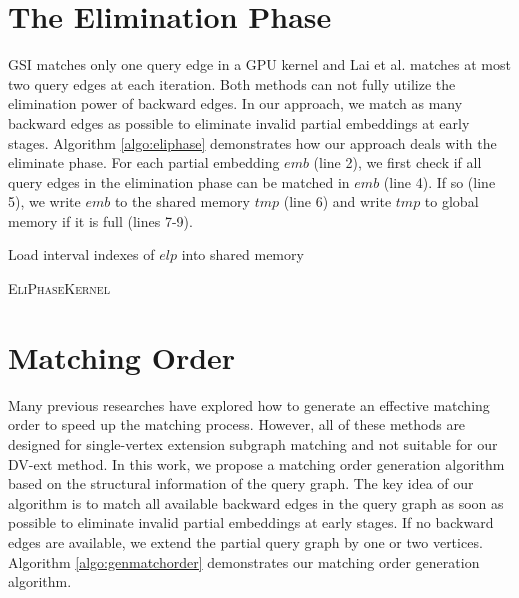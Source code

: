 \section{The Elimination Phase} \label{sec:eliphase} GSI \cite{zeng2020gsi} matches only one query edge in a GPU kernel and Lai et al.
\cite{lai2015scalable} matches at most two query edges at each iteration. Both methods can not fully utilize the elimination power of
backward edges. In our approach, we match as many backward edges as possible to eliminate invalid partial embeddings at early stages.
Algorithm \ref{algo:eliphase} demonstrates how our approach deals with the eliminate phase. For each partial embedding $emb$ (line 2), we
first check if all query edges in the elimination phase can be matched in $emb$ (line 4). If so (line 5), we write $emb$ to the shared
memory $tmp$ (line 6) and write $tmp$ to global memory if it is full (lines 7-9).
\begin{algorithm}
Load interval indexes of $elp$ into shared memory\;
\caption{\textsc{EliPhaseKernel}}
\label{algo:eliphase}
\end{algorithm}



\section{Matching Order} Many previous researches \cite{bi2016efficient,sun2020subgraph,sun2020rapidmatch,guo2020gpu} have explored how to
generate an effective matching order to speed up the matching process. However, all of these methods are designed for single-vertex
extension subgraph matching and not suitable for our DV-ext method. In this work, we propose a matching order generation algorithm based on
the structural information of the query graph. The key idea of our algorithm is to match all available backward edges in the query graph as
soon as possible to eliminate invalid partial embeddings at early stages. If no backward edges are available, we extend the partial query
graph by one or two vertices. Algorithm \ref{algo:genmatchorder} demonstrates our matching order generation algorithm.

